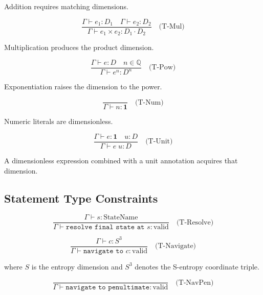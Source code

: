 \documentclass[twocolumn,10pt]{article}
\theoremstyle{definition}
\theoremstyle{remark}
\begin{document}
Addition requires matching dimensions.

\begin{equation}
    \frac{\Gamma \vdash e_1 : D_1 \quad \Gamma \vdash e_2 : D_2}{\Gamma \vdash e_1 \times e_2 : D_1 \cdot D_2}
    \quad \text{(T-Mul)}
\end{equation}

Multiplication produces the product dimension.

\begin{equation}
    \frac{\Gamma \vdash e : D \quad n \in \mathbb{Q}}{\Gamma \vdash e^n : D^n}
    \quad \text{(T-Pow)}
\end{equation}

Exponentiation raises the dimension to the power.

\begin{equation}
    \frac{}{\Gamma \vdash n : \mathbf{1}}
    \quad \text{(T-Num)}
\end{equation}

Numeric literals are dimensionless.

\begin{equation}
    \frac{\Gamma \vdash e : \mathbf{1} \quad u : D}{\Gamma \vdash e \; u : D}
    \quad \text{(T-Unit)}
\end{equation}

A dimensionless expression combined with a unit annotation acquires that dimension.

\subsection{Statement Type Constraints}

\begin{equation}
    \frac{\Gamma \vdash s : \text{StateName}}{\Gamma \vdash \texttt{resolve final state at } s : \text{valid}}
    \quad \text{(T-Resolve)}
\end{equation}

\begin{equation}
    \frac{\Gamma \vdash c : S^3}{\Gamma \vdash \texttt{navigate to } c : \text{valid}}
    \quad \text{(T-Navigate)}
\end{equation}

where $S$ is the entropy dimension and $S^3$ denotes the S-entropy coordinate triple.

\begin{equation}
    \frac{}{\Gamma \vdash \texttt{navigate to penultimate} : \text{valid}}
    \quad \text{(T-NavPen)}
\end{equation}
\end{document}
